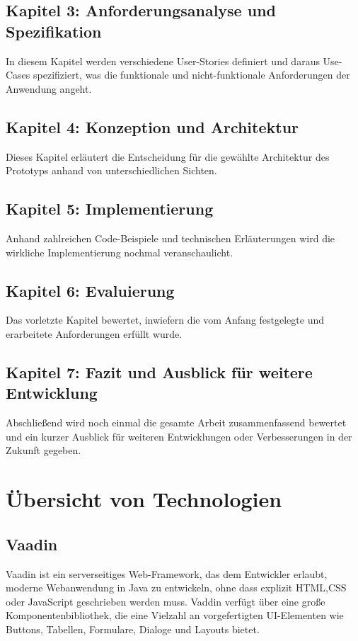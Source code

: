\documentclass[a4paper,12pt]{scrreprt}
\begin{document}
	\section*{\small \textbf{Kapitel 3: Anforderungsanalyse und Spezifikation}}
	In diesem Kapitel werden verschiedene User-Stories definiert und daraus Use-Cases spezifiziert, was die funktionale und nicht-funktionale Anforderungen der Anwendung angeht.  
	\section*{\small \textbf{Kapitel 4: Konzeption und Architektur}}
	Dieses Kapitel erläutert die Entscheidung für die gewählte Architektur des Prototyps anhand von unterschiedlichen Sichten.
	\section*{\small \textbf{Kapitel 5: Implementierung}}
	Anhand zahlreichen Code-Beispiele und technischen Erläuterungen wird die wirkliche Implementierung nochmal veranschaulicht. 
	\section*{\small \textbf{Kapitel 6: Evaluierung}}
	Das vorletzte Kapitel bewertet, inwiefern die vom Anfang festgelegte und erarbeitete Anforderungen erfüllt wurde. 
	\section*{\small \textbf{Kapitel 7: Fazit und Ausblick für weitere Entwicklung}}
	Abschließend wird noch einmal die gesamte Arbeit zusammenfassend bewertet und ein kurzer Ausblick für weiteren Entwicklungen oder Verbesserungen in der Zukunft gegeben.
	
	\chapter{Übersicht von Technologien}
	\section{Vaadin}
	Vaadin ist ein serverseitiges Web-Framework, das dem Entwickler erlaubt, moderne Webanwendung in Java zu entwickeln, ohne dass explizit HTML,CSS oder JavaScript geschrieben werden muss. Vaddin verfügt über eine große Komponentenbibliothek, die eine Vielzahl an vorgefertigten UI-Elementen wie Buttons, Tabellen, Formulare, Dialoge und Layouts bietet.
	
\end{document}
